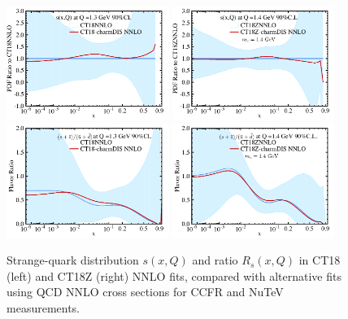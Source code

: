 	\begin{figure}[b]
		\begin{center}
			\includegraphics[width=0.47\textwidth]{fig/CT18dimuonalts1_KP.pdf}\hspace{0.1in}
			\includegraphics[width=0.47\textwidth]{fig/CT18Zdimuonalts1_KP.pdf}
			\includegraphics[width=0.47\textwidth]{fig/CT18dimuonalts2_KP.pdf}\hspace{0.1in}
			\includegraphics[width=0.47\textwidth]{fig/CT18Zdimuonalts2_KP.pdf}
		\end{center}
		\vspace{-2ex}
		\caption{\label{fig:dimuonalt}
			Strange-quark distribution $s(x,Q)$  and ratio $R_s(x,Q)$ in CT18 (left) and
			CT18Z (right) NNLO fits, compared with alternative fits using QCD NNLO cross sections for CCFR and NuTeV measurements.
		}
	\end{figure}
	

